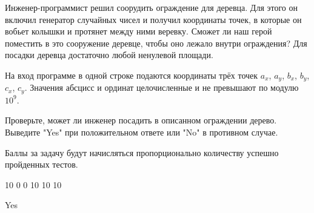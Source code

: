 
Инженер-программист решил соорудить ограждение для деревца. Для этого он включил генератор случайных чисел и получил координаты точек, в которые он вобьет колышки и протянет между ними веревку. Сможет ли наш герой поместить в это сооружение деревце, чтобы оно лежало внутри ограждения? Для посадки деревца достаточно любой ненулевой площади.

На вход программе в одной строке подаются координаты трёх точек $a_x$, $a_y$, $b_x$, $b_y$, $c_x$, $c_y$. 
Значения абсцисс и ординат целочисленные и не превышают по модулю $10^9$. 

\outputfmtSection
Проверьте, может ли инженер посадить в описанном ограждении дерево. Выведите "Yes" при положительном ответе или "No" в противном случае.

\markSection

Баллы за задачу будут начисляться пропорционально количеству успешно пройденных тестов.


\begin{myverbbox}[\small]{\vinput}
    10 0 0 10 10 10
\end{myverbbox}

\begin{myverbbox}[\small]{\voutput}
    Yes
\end{myverbbox}

